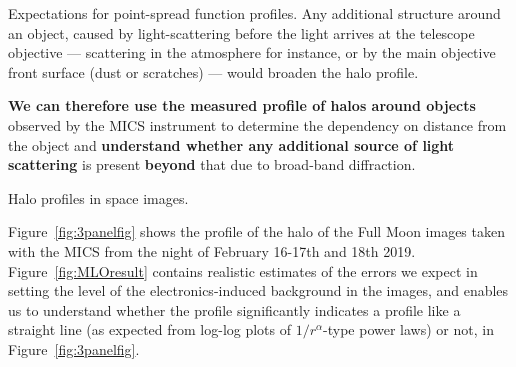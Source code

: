 \documentclass[final,hyperref={pdfpagelabels=false}]{beamer}
\begin{document}
\begin{frame}[t]
\begin{columns}[t]
\begin{column}{.23\textwidth}
\begin{block}{Expectations for point-spread function profiles.}
Any additional structure around an object, caused by light-scattering before the light arrives at the telescope objective --- scattering in  the atmosphere for instance, or by the main objective front surface (dust or scratches) --- would broaden the halo profile.

\textbf{We can therefore use the measured profile of halos around objects} observed by the MICS instrument to determine the dependency on distance from the object and \textbf{understand whether any additional source of light scattering} is present \textbf{beyond} that due to broad-band diffraction. 

\end{block}

\begin{block}{Halo profiles in space images.}

Figure~\ref{fig:3panelfig} shows the profile of the halo of the Full Moon images taken with the MICS from the night of February 16-17th and 18th 2019. Figure~\ref{fig:MLOresult} contains realistic estimates of the errors we expect in setting the level of the electronics-induced background in the images, and enables us to understand whether the profile significantly indicates a profile like a straight line (as expected from log-log plots of $1/r^{\alpha}$-type power laws) or not, in Figure~\ref{fig:3panelfig}.


\end{block}
\end{column}
\end{columns}
\end{frame}
\end{document}
